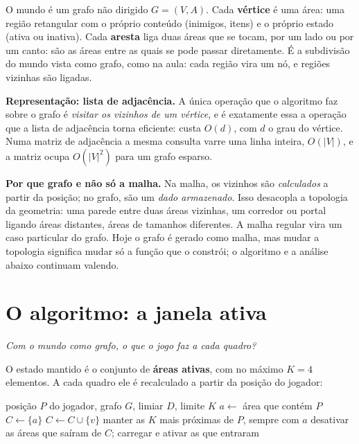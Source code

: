 \documentclass[11pt,a4paper]{article}
\newcommand{\gancho}[1]{\textcolor{destaque}{\textit{#1}}\par}
\begin{document}
O mundo é um grafo não dirigido $G = (V, A)$. Cada \textbf{vértice} é uma área:
uma região retangular com o próprio conteúdo (inimigos, itens) e o próprio
estado (ativa ou inativa). Cada \textbf{aresta} liga duas áreas que se tocam,
por um lado ou por um canto: são as áreas entre as quais se pode passar
diretamente. É a subdivisão do mundo vista como grafo, como na
aula: cada região vira um nó, e regiões vizinhas são ligadas.

\textbf{Representação: lista de adjacência.} A única operação que o algoritmo
faz sobre o grafo é \emph{visitar os vizinhos de um vértice}, e é exatamente
essa a operação que a lista de adjacência torna eficiente: custa $O(d)$, com
$d$ o grau do vértice. Numa matriz de adjacência a mesma consulta varre uma
linha inteira, $O(|V|)$, e a matriz ocupa $O(|V|^2)$ para um grafo esparso.

\textbf{Por que grafo e não só a malha.} Na malha, os vizinhos são
\emph{calculados} a partir da posição; no grafo, são um \emph{dado
armazenado}. Isso desacopla a topologia da geometria: uma parede entre duas
áreas vizinhas, um corredor ou portal ligando áreas distantes, áreas de tamanhos
diferentes. A malha regular vira um caso particular do grafo. Hoje o grafo é
gerado como malha, mas mudar a topologia significa mudar só a função que o
constrói; o algoritmo e a análise abaixo continuam valendo.

\section{O algoritmo: a janela ativa}

\gancho{Com o mundo como grafo, o que o jogo faz a cada quadro?}

O estado mantido é o conjunto de \textbf{áreas ativas}, com no máximo $K = 4$
elementos. A cada quadro ele é recalculado a partir da posição do jogador:

\begin{algorithm}[h]
\caption{Atualização das áreas ativas}
\begin{algorithmic}[1]
\Require posição $P$ do jogador, grafo $G$, limiar $D$, limite $K$
\State $a \gets$ área que contém $P$ 
\State $C \gets \{a\}$
 
   $C \gets C \cup \{v\}$ \EndIf
\EndFor
{} manter as $K$ mais próximas de $P$, sempre com $a$ \EndIf
\State desativar as áreas que saíram de $C$; carregar e ativar as que entraram
\end{algorithmic}
\end{algorithm}
\end{document}
